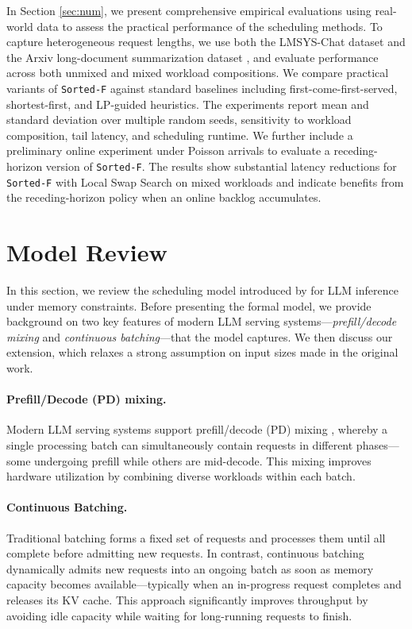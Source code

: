\documentclass[nonblindrev]{informs3_hide}
\newcommand{\xhdr}[1]{\vspace{1mm} \noindent{\bf #1}}
\newcommand{\sortF}{\texttt{Sorted-F}}
\begin{document}
\xhdr{Numerical Experiments. }
In Section \ref{sec:num}, we present comprehensive empirical evaluations using real-world data to assess the practical performance of the scheduling methods. To capture heterogeneous request lengths, we use both the LMSYS-Chat dataset \citep{zheng2023lmsys} and the Arxiv long-document summarization dataset \citep{cohan2018discourse}, and evaluate performance across both unmixed and mixed workload compositions. We compare practical variants of \sortF{} against standard baselines including first-come-first-served, shortest-first, and LP-guided heuristics. The experiments report mean and standard deviation over multiple random seeds, sensitivity to workload composition, tail latency, and scheduling runtime. We further include a preliminary online experiment under Poisson arrivals to evaluate a receding-horizon version of \sortF{}. The results show substantial latency reductions for \sortF{} with Local Swap Search on mixed workloads and indicate benefits from the receding-horizon policy when an online backlog accumulates.


\section{Model Review} \label{sec:model}

In this section, we review the scheduling model introduced by \cite{jaillet2025online} for LLM inference under memory constraints. Before presenting the formal model, we provide background on two key features of modern LLM serving systems—\emph{prefill/decode mixing} and \emph{continuous batching}—that the model captures. We then discuss our extension, which relaxes a strong assumption on input sizes made in the original work.

\paragraph{Prefill/Decode (PD) mixing.} 
Modern LLM serving systems support prefill/decode (PD) mixing \cite{kwon2023efficient}, whereby a single processing batch can simultaneously contain requests in different phases—some undergoing prefill while others are mid-decode. This mixing improves hardware utilization by combining diverse workloads within each batch.

\paragraph{Continuous Batching.} 
Traditional batching forms a fixed set of requests and processes them until all complete before admitting new requests. In contrast, continuous batching dynamically admits new requests into an ongoing batch as soon as memory capacity becomes available—typically when an in-progress request completes and releases its KV cache. This approach significantly improves throughput by avoiding idle capacity while waiting for long-running requests to finish.
\end{document}
